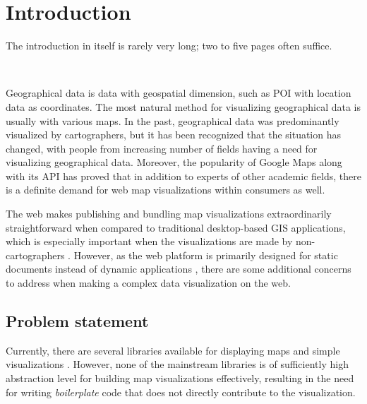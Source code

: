 
\chapter{Introduction}
\label{chapter:intro}

The introduction in itself is rarely very long; two to five pages often
suffice.

~


Geographical data is data with geospatial dimension, such as POI with location data as coordinates. The most natural method for visualizing geographical data is usually with various maps. In the past, geographical data was predominantly visualized by cartographers, but it has been recognized \citep{kraak_visualization_1999} that the situation has changed, with people from increasing number of fields having a need for visualizing geographical data. Moreover, the popularity of Google Maps \citep{google_maps_2005} along with its API \citep{google_maps_2005-1} has proved that in addition to experts of other academic fields, there is a definite demand for web map visualizations within consumers as well. 

The web makes publishing and bundling map visualizations extraordinarily straightforward when compared to traditional desktop-based GIS applications, which is especially important when the visualizations are made by non-cartographers . However, as the web platform is primarily designed for static documents instead of dynamic applications \citep{berners-lee_information_1989,berners-lee_world-wide_1992}, there are some additional concerns to address when making a complex data visualization on the web.



\section{Problem statement}

Currently, there are several libraries available for displaying maps and simple visualizations . However, none of the mainstream libraries is of sufficiently high abstraction level for building map visualizations effectively, resulting in the need for writing \emph{boilerplate} code that does not directly contribute to the visualization.

